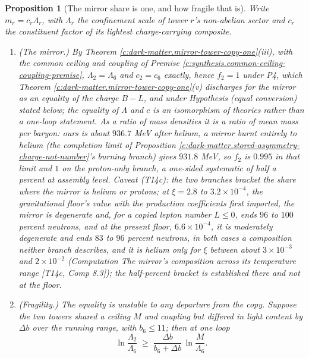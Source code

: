 \documentclass[11pt]{article}
\newtheorem{proposition}[theorem]{Proposition}
\theoremstyle{definition}
\theoremstyle{plain}
\newcommand{\changedmark}[2]{\marginpar{\raggedright\scriptsize\color{#1}#2}}
\begin{document}
\begin{proposition}[The mirror share is one, and how fragile that is]\label{c:dark-matter.mirror-share-one-how-fragile}
\changedmark{BurntOrange}{changed since the deposit}
Write $m_{r} = c_{r}\Lambda_{r}$, with $\Lambda_{r}$ the confinement scale of tower $r$'s non-abelian sector and $c_{r}$ the constituent factor of its lightest charge-carrying composite.
\begin{enumerate}
\item[(i)] \emph{(The mirror.)} By Theorem \ref{c:dark-matter.mirror-tower-copy-one}(iii), with the common ceiling and coupling of Premise \ref{c:synthesis.common-ceiling-coupling-premise}, $\Lambda_{2} = \Lambda_{6}$ and $c_{2} = c_{6}$ exactly, hence $f_{2} = 1$ under P4, which Theorem \ref{c:dark-matter.mirror-tower-copy-one}(v) discharges for the mirror as an equality of the charge $B - L$, and under Hypothesis (equal conversion) stated below; the equality of $\Lambda$ and $c$ is an isomorphism of theories rather than a one-loop statement. As a ratio of mass densities it is a ratio of mean mass per baryon: ours is about $936.7$ MeV after helium, a mirror burnt entirely to helium (the completion limit of Proposition \ref{c:dark-matter.stored-asymmetry-charge-not-number}'s burning branch) gives $931.8$ MeV, so $f_{2}$ is $0.995$ in that limit and $1$ on the proton-only branch, a one-sided systematic of half a percent at assembly level. Caveat (T14c): the two branches bracket the share where the mirror is helium or protons; at $\xi = 2.8$ to $3.2 \times 10^{-4}$, the gravitational floor's value with the production coefficients first imported, the mirror is degenerate and, for a copied lepton number $L \leq 0$, ends $96$ to $100$ percent neutrons, and at the present floor, $6.6 \times 10^{-4}$, it is moderately degenerate and ends $83$ to $96$ percent neutrons, in both cases a composition neither branch describes, and it is helium only for $\xi$ between about $3 \times 10^{-3}$ and $2 \times 10^{-2}$ (Computation \emph{The mirror's composition across its temperature range} [T14c, Comp 8.3]); the half-percent bracket is established there and not at the floor.
\item[(ii)] \emph{(Fragility.)} The equality is unstable to any departure from the copy. Suppose the two towers shared a ceiling $M$ and coupling but differed in light content by $\Delta b$ over the running range, with $b_{6} \leq 11$; then at one loop
\[
\ln\frac{\Lambda_{2}}{\Lambda_{6}} \;\geq\; \frac{\Delta b}{b_{6} + \Delta b}\,\ln\frac{M}{\Lambda_{6}}.
\]

\end{enumerate}
\end{proposition}
\end{document}
